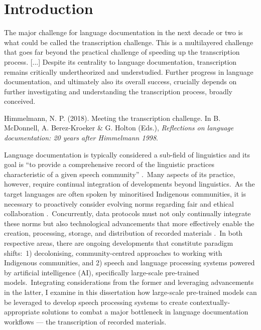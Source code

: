 \documentclass[main.tex]{subfiles}
\begin{document}
\chapter{Introduction}

\setlength{\epigraphwidth}{0.75\textwidth}
\renewcommand{\textflush}{flushepinormal}
\epigraph{The major challenge for language documentation in the next decade or two is what could be called the transcription challenge. This is a multilayered challenge that goes far beyond the practical challenge of speeding up the transcription process. [...] Despite its centrality to language documentation, transcription remains critically undertheorized and understudied. Further progress in language documentation, and ultimately also its overall success, crucially depends on further investigating and understanding the transcription process, broadly conceived.}%
         {\justifying{}Himmelmann, N. P. (2018). Meeting the transcription challenge. In B. McDonnell, A. Berez-Kroeker \& G. Holton (Eds.), \emph{Reflections on language documentation: 20 years after Himmelmann 1998}.}

Language documentation is typically considered a sub-field of linguistics and its goal is ``to provide a comprehensive record of the linguistic practices characteristic of a given speech community'' \parencite[][p.~166]{himmelmann1998documentary}.~Many aspects of its practice, however, require continual integration of developments beyond linguistics.~As the target languages are often spoken by minoritised Indigenous communities, it is necessary to proactively consider evolving norms regarding fair and ethical collaboration \parencite{holton2022indigenous}.~Concurrently, data protocols must not only continually integrate these norms but also technological advancements that more effectively enable the creation, processing, storage, and distribution of recorded materials \parencite{berez2023recent}.~In both respective areas, there are ongoing developments that constitute paradigm shifts:~1) decolonising, community-centred approaches to working with Indigenous communities, and 2) speech and language processing systems powered by artificial intelligence (AI), specifically large-scale pre-trained models.~Integrating considerations from the former and leveraging advancements in the latter, I examine in this dissertation how large-scale pre-trained models can be leveraged to develop speech processing systems to create contextually-appropriate solutions to combat a major bottleneck in language documentation workflows --- 
the transcription of recorded materials.
\end{document}
